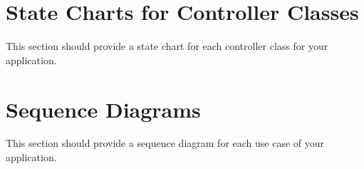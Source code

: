 \documentclass[]{article}
\begin{document}


\section{State Charts for Controller Classes}
\label{sec:state_charts_for_controller_classes}
This section should provide a state chart for each controller class for your application.

\section{Sequence Diagrams}
\label{sec:sequence_diagrams}
This section should provide a sequence diagram for each use case of your application.
\end{document}
